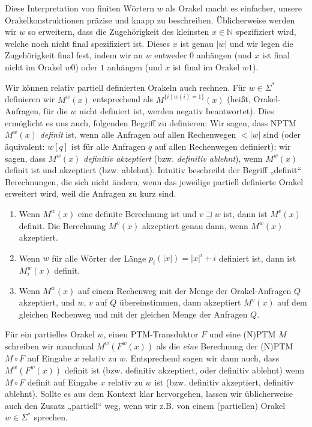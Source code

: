 Diese Interpretation von finiten Wörtern $w$ als Orakel macht es einfacher, unsere Orakelkonstruktionen präzise und knapp zu beschreiben. Üblicherweise werden wir $w$ so erweitern, dass die Zugehörigkeit des kleinsten $x\in\mathbb N$ spezifiziert wird, welche noch nicht final spezifiziert ist. Dieses $x$ ist genau $|w|$ und wir legen die Zugehörigkeit final fest, indem wir an $w$ entweder $0$ anhängen (und $x$ ist final nicht im Orakel $w0$) oder $1$ anhängen (und $x$ ist final im Orakel $w1$).


Wir können relativ partiell definierten Orakeln auch rechnen. Für $w\in\Sigma^*$ definieren wir $M^w(x)$ entsprechend als $M^{\{i\mid w(i)=1\}}(x)$ (heißt, Orakel-Anfragen, für die $w$ nicht definiert ist, werden negativ beantwortet).
Dies ermöglicht es uns auch, folgenden Begriff zu definieren: Wir sagen, dass NPTM $M^w(x)$ \emph{definit} ist, wenn alle Anfragen auf allen Rechenwegen $<|w|$ sind (oder äquivalent: $w[q]$ ist für alle Anfragen $q$ auf allen Rechenwegen definiert); wir sagen, dass $M^w(x)$ \emph{definitiv akzeptiert} (bzw. \emph{definitiv ablehnt}), wenn $M^w(x)$ definit ist und akzeptiert (bzw. ablehnt). Intuitiv beschreibt der Begriff „definit“ Berechnungen, die sich nicht ändern, wenn das jeweilige partiell definierte Orakel erweitert wird, weil die Anfragen zu kurz sind.
\begin{observation}\label{obs:partialoracles}
    \begin{enumerate}
        \item Wenn $M^w(x)$ eine definite Berechnung ist und $v\sqsupseteq w$ ist, dann ist $M^v(x)$ definit. Die Berechnung $M^v(x)$ akzeptiert genau dann, wenn $M^w(x)$ akzeptiert.
        \item Wenn $w$ für alle Wörter der Länge $p_i(|x|)=|x|^i+i$ definiert ist, dann ist $M_i^w(x)$ definit.
        \item Wenn $M^w(x)$ auf einem Rechenweg mit der Menge der Orakel-Anfragen $Q$ akzeptiert, und $w$, $v$ auf $Q$ übereinstimmen, dann akzeptiert $M^v(x)$ auf dem gleichen Rechenweg und mit der gleichen Menge der Anfragen $Q$.
    \end{enumerate}
\end{observation}

Für ein partielles Orakel $w$, einen PTM-Transduktor $F$ und eine (N)PTM $M$ schreiben wir manchmal $M^w(F^w(x))$ als die \emph{eine} Berechnung der (N)PTM $M\circ F$ auf Eingabe $x$ relativ zu $w$.
Entsprechend sagen wir dann auch, dass $M^w(F^w(x))$ definit ist (bzw. definitiv akzeptiert, oder definitiv ablehnt) wenn $M\circ F$ definit auf Eingabe $x$ relativ zu $w$ ist (bzw. definitiv akzeptiert, definitiv ablehnt).
Sollte es aus dem Kontext klar hervorgehen, lassen wir üblicherweise auch den Zusatz „partiell“ weg, wenn wir z.B. von einem (partiellen) Orakel $w\in\Sigma^*$ sprechen.

